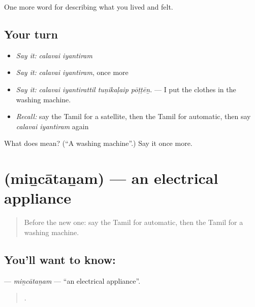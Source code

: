 \begin{grammarlens}[title={What you've built}]
One more word for describing what you lived and felt.
\end{grammarlens}

\subsection*{Your turn}
\begin{itemize}
\raggedright
  \item \emph{Say it:} \emph{calavai iyantiram}
  \item \emph{Say it:} \emph{calavai iyantiram}, once more
  \item \emph{Say it:} \emph{calavai iyantirattil tuṇikaḷaip pōṭṭēṉ.} — I put the clothes in the washing machine.
  \item \emph{Recall:} say the Tamil for a satellite, then the Tamil for automatic, then say \emph{calavai iyantiram} again
\end{itemize}

\begin{tcolorbox}[breakable,colback=teal!4,colframe=teal!35!black,title={Before you move on}]
What does   mean? (\textquotedblleft{}A washing machine\textquotedblright{}.) Say it once more.
\end{tcolorbox}
\section[\texorpdfstring{\ta{மின்சாதனம்} (miṉcātaṉam)}{மின்சாதனம் (miṉcātaṉam)}]{ (miṉcātaṉam) — an electrical appliance}

\label{lesson:TA-C520-mincatanam}



\begin{quote}
Before the new one: say the Tamil for automatic, then the Tamil for a washing machine.
\end{quote}

\subsection*{You'll want to know: }
\textbf{} — \emph{miṉcātaṉam} — \textquotedblleft{}an electrical appliance\textquotedblright{}.

\begin{quote}
   .
\end{quote}

